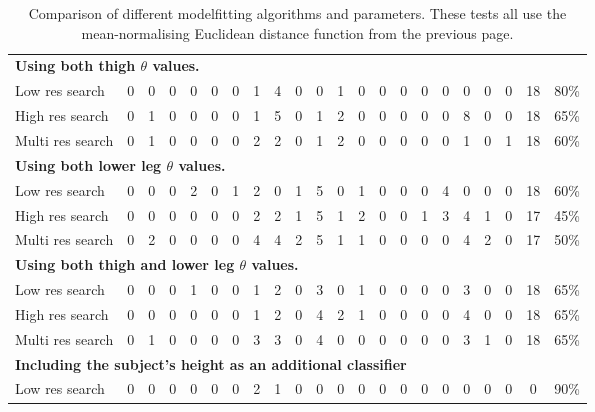 \begin{landscape}
\begin{table}[p]
\begin{tabular}{|l|c@{ }c|c@{ }c|c@{ }c|c@{ }c|c@{ }c|c@{ }c|c@{ }c|c@{ }c|c@{ }c|c@{ }c|c|}
			\hline
			\multicolumn{22}{|l|}{\textbf{Using both thigh $\theta$ values.}} \\
			Low res search             & 0 & 0 & 0 & 0 & 0 & 0 & 1 & 4 & 0 & 0 & 1 & 0 & 0 & 0 & 0 & 0 & 0 & 0 & 0 & 18 & 80\% \\
			High res search            & 0 & 1 & 0 & 0 & 0 & 0 & 1 & 5 & 0 & 1 & 2 & 0 & 0 & 0 & 0 & 0 & 8 & 0 & 0 & 18 & 65\% \\
			Multi res search           & 0 & 1 & 0 & 0 & 0 & 0 & 2 & 2 & 0 & 1 & 2 & 0 & 0 & 0 & 0 & 0 & 1 & 0 & 1 & 18 & 60\% \\
			
			\hline
			\multicolumn{22}{|l|}{\textbf{Using both lower leg $\theta$ values.}} \\
			Low res search             & 0 & 0 & 0 & 2 & 0 & 1 & 2 & 0 & 1 & 5 & 0 & 1 & 0 & 0 & 0 & 4 & 0 & 0 & 0 & 18 & 60\% \\
			High res search            & 0 & 0 & 0 & 0 & 0 & 0 & 2 & 2 & 1 & 5 & 1 & 2 & 0 & 0 & 1 & 3 & 4 & 1 & 0 & 17 & 45\% \\
			Multi res search           & 0 & 2 & 0 & 0 & 0 & 0 & 4 & 4 & 2 & 5 & 1 & 1 & 0 & 0 & 0 & 0 & 4 & 2 & 0 & 17 & 50\% \\
			
			\hline
			\multicolumn{22}{|l|}{\textbf{Using both thigh and lower leg $\theta$ values.}} \\
			Low res search             & 0 & 0 & 0 & 1 & 0 & 0 & 1 & 2 & 0 & 3 & 0 & 1 & 0 & 0 & 0 & 0 & 3 & 0 & 0 & 18 & 65\% \\
			High res search            & 0 & 0 & 0 & 0 & 0 & 0 & 1 & 2 & 0 & 4 & 2 & 1 & 0 & 0 & 0 & 0 & 4 & 0 & 0 & 18 & 65\% \\
			Multi res search           & 0 & 1 & 0 & 0 & 0 & 0 & 3 & 3 & 0 & 4 & 0 & 0 & 0 & 0 & 0 & 0 & 3 & 1 & 0 & 18 & 65\% \\
			
			\hline
			\multicolumn{22}{|l|}{\textbf{Including the subject's height as an additional classifier}} \\
			Low res search             & 0 & 0 & 0 & 0 & 0 & 0 & 2 & 1 & 0 & 0 & 0 & 0 & 0 & 0 & 0 & 0 & 0 & 0 & 0 & 0 & 90\% \\
			
			\hline
		\end{tabular}
		\caption{Comparison of different modelfitting algorithms and parameters.
			These tests all use the mean-normalising Euclidean distance function from the previous page.}
		\label{ClassificationResults2}
	\end{table}
\end{landscape}

